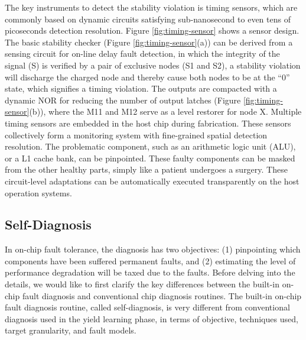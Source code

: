 The key instruments to detect the stability violation is timing sensors, which are commonly based on dynamic circuits satisfying sub-nanosecond to even tens of picoseconds detection resolution. Figure \ref{fig:timing-sensor} shows a sensor design. The basic stability checker (Figure \ref{fig:timing-sensor}(a)) can be derived from a sensing circuit for on-line delay fault detection, in which the integrity of the signal (S) is verified by a pair of exclusive nodes (S1 and S2), a stability violation will discharge the charged node and thereby cause both nodes to be at the “0” state, which signifies a timing violation. The outputs are compacted with a dynamic NOR for reducing the number of output latches (Figure \ref{fig:timing-sensor}(b)), where the M11 and M12 serve as a level restorer for node X. Multiple timing sensors are embedded in the host chip during fabrication. These sensors collectively form a monitoring system with fine-grained spatial detection resolution. The problematic component, such as an arithmetic logic unit (ALU), or a L1 cache bank, can be pinpointed. These faulty components can be masked from the other healthy parts, simply like a patient undergoes a surgery. These circuit-level adaptations can be automatically executed transparently on the host operation systems.

\subsection{Self-Diagnosis}
In on-chip fault tolerance, the diagnosis has two objectives: (1) pinpointing which components have been suffered permanent faults, and (2) estimating the level of performance degradation will be taxed due to the faults. Before delving into the details, we would like to first clarify the key differences between the built-in on-chip fault diagnosis and conventional chip diagnosis routines. The built-in on-chip fault diagnosis routine, called self-diagnosis, is very different from conventional diagnosis used in the yield learning phase, in terms of objective, techniques used, target granularity, and fault models.

